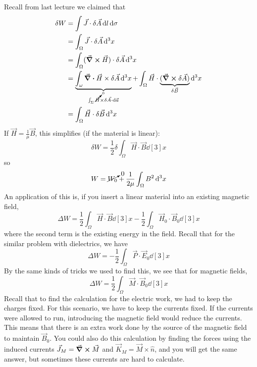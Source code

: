 \documentclass[a4paper,twoside,master.tex]{subfiles}
\begin{document}

Recall from last lecture we claimed that
\begin{align}
    \delta W &= \int \vec{J} \cdot \delta \vec{A} \dd{l} \dd{\sigma}\\
    &= \int_{\Omega} \vec{J} \cdot \delta \vec{A} \dd[3]{x} \\
    &= \int_{\Omega} (\curl{ \vec{H}}) \cdot \delta \vec{A} \dd[3]{x}\\
    &= \underbrace{\int_{\omega} \div{ \vec{H} \times \delta \vec{A}} \dd[3]{x}}_{\int_{\Sigma} \cancelto{0}{\vec{H}} \times \delta \vec{A} \cdot \dd{ \vec{a}}} + \int_{\Omega} \vec{H} \cdot \underbrace{(\curl{\delta \vec{A}})}_{\delta \vec{B}} \dd[3]{x} \\
    &= \int_{\Omega} \vec{H} \cdot \delta \vec{B} \dd[3]{x}
\end{align}
If $ \vec{H} = \frac{1}{\mu} \vec{B} $, this simplifies (if the material is linear):
\begin{equation}
    \delta W = \frac{1}{2} \delta \int_{\Omega} \vec{H} \cdot \vec{B} \dd[3]{x}
\end{equation}
so
\begin{equation}
    W = \cancelto{0}{W_0} + \frac{1}{2\mu} \int_{\Omega} B^2 \dd[3]{x} 
\end{equation}
An application of this is, if you insert a linear material into an existing magnetic field,
\begin{equation}
    \Delta W = \frac{1}{2} \int_{\Omega} \vec{H} \cdot \vec{B} \dd[3]{x} - \frac{1}{2} \int_{\Omega} \vec{H}_0 \cdot \vec{B}_0 \dd[3]{x}
\end{equation}
where the second term is the existing energy in the field. Recall that for the similar problem with dielectrics, we have
\begin{equation}
    \Delta W = - \frac{1}{2} \int_{\Omega} \vec{P} \cdot \vec{E}_0 \dd[3]{x}
\end{equation}
By the same kinds of tricks we used to find this, we see that for magnetic fields,
\begin{equation}
    \Delta W = \frac{1}{2} \int_{\Omega} \vec{M} \cdot \vec{B}_0 \dd[3]{x}
\end{equation}
Recall that to find the calculation for the electric work, we had to keep the charges fixed. For this scenario, we have to keep the currents fixed. If the currents were allowed to run, introducing the magnetic field would reduce the currents. This means that there is an extra work done by the source of the magnetic field to maintain $ \vec{B}_0 $. You could also do this calculation by finding the forces using the induced currents $ \vec{J}_{M} = \curl{ \vec{M} } $ and $ \vec{K}_{M} = \vec{M} \times \hat{n} $, and you will get the same answer, but sometimes these currents are hard to calculate.
\end{document}
